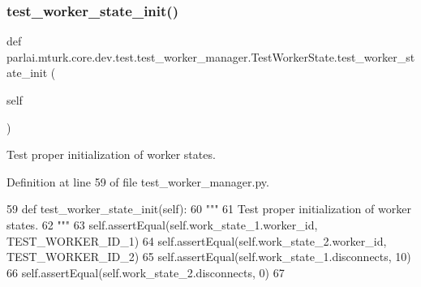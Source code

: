 \mbox{\label{classparlai_1_1mturk_1_1core_1_1dev_1_1test_1_1test__worker__manager_1_1TestWorkerState_aa8a9f7fe801eb68ee6728fe3f0fc134d}} 
\subsubsection{\texorpdfstring{test\+\_\+worker\+\_\+state\+\_\+init()}{test\_worker\_state\_init()}}
{\footnotesize\ttfamily def parlai.\+mturk.\+core.\+dev.\+test.\+test\+\_\+worker\+\_\+manager.\+Test\+Worker\+State.\+test\+\_\+worker\+\_\+state\+\_\+init (\begin{DoxyParamCaption}\item[{}]{self }\end{DoxyParamCaption})}

\begin{DoxyVerb}Test proper initialization of worker states.
\end{DoxyVerb}
 

Definition at line 59 of file test\+\_\+worker\+\_\+manager.\+py.


\begin{DoxyCode}
59     \textcolor{keyword}{def }test\_worker\_state\_init(self):
60         \textcolor{stringliteral}{"""}
61 \textcolor{stringliteral}{        Test proper initialization of worker states.}
62 \textcolor{stringliteral}{        """}
63         self.assertEqual(self.work\_state\_1.worker\_id, TEST\_WORKER\_ID\_1)
64         self.assertEqual(self.work\_state\_2.worker\_id, TEST\_WORKER\_ID\_2)
65         self.assertEqual(self.work\_state\_1.disconnects, 10)
66         self.assertEqual(self.work\_state\_2.disconnects, 0)
67 
\end{DoxyCode}


